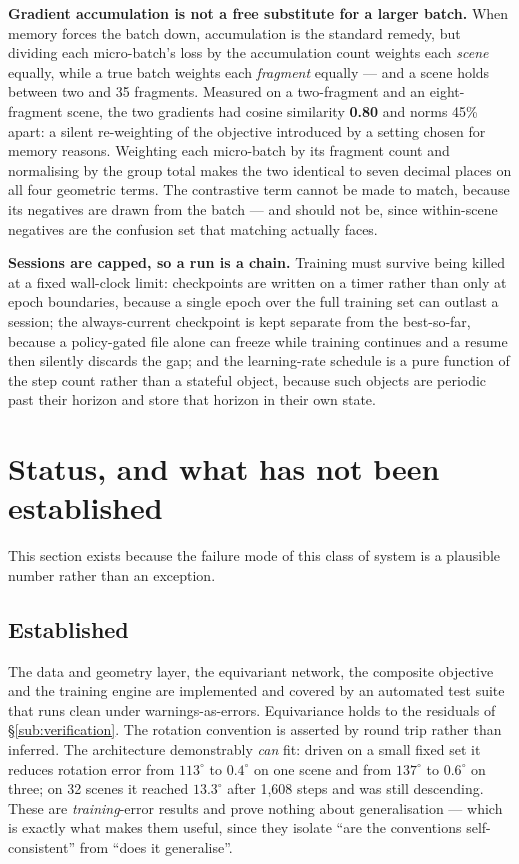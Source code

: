 \documentclass[11pt,a4paper]{report}
\newcommand{\measured}[1]{\textbf{#1}}
\begin{document}
\textbf{Gradient accumulation is not a free substitute for a larger batch.} When
memory forces the batch down, accumulation is the standard remedy, but dividing
each micro-batch's loss by the accumulation count weights each \emph{scene}
equally, while a true batch weights each \emph{fragment} equally --- and a scene
holds between two and 35 fragments. Measured on a two-fragment and an
eight-fragment scene, the two gradients had cosine similarity \measured{0.80}
and norms 45\% apart: a silent re-weighting of the objective introduced by a
setting chosen for memory reasons. Weighting each micro-batch by its fragment
count and normalising by the group total makes the two identical to seven
decimal places on all four geometric terms. The contrastive term cannot be made
to match, because its negatives are drawn from the batch --- and should not be,
since within-scene negatives are the confusion set that matching actually faces.

\textbf{Sessions are capped, so a run is a chain.} Training must survive being
killed at a fixed wall-clock limit: checkpoints are written on a timer rather
than only at epoch boundaries, because a single epoch over the full training set
can outlast a session; the always-current checkpoint is kept separate from the
best-so-far, because a policy-gated file alone can freeze while training
continues and a resume then silently discards the gap; and the learning-rate
schedule is a pure function of the step count rather than a stateful object,
because such objects are periodic past their horizon and store that horizon in
their own state.

\section{Status, and what has not been established}
\label{sec:status}

This section exists because the failure mode of this class of system is a
plausible number rather than an exception.

\subsection{Established}

The data and geometry layer, the equivariant network, the composite objective
and the training engine are implemented and covered by an automated test suite
that runs clean under warnings-as-errors. Equivariance holds to the residuals of
\S\ref{sub:verification}. The rotation convention is asserted by round trip rather than inferred.
The architecture demonstrably \emph{can} fit: driven on a small fixed set it
reduces rotation error from $113^{\circ}$ to \measured{$0.4^{\circ}$} on one
scene and from $137^{\circ}$ to \measured{$0.6^{\circ}$} on three; on 32 scenes
it reached $13.3^{\circ}$ after 1{,}608 steps and was still descending. These
are \emph{training}-error results and prove nothing about generalisation --- which
is exactly what makes them useful, since they isolate ``are the conventions
self-consistent'' from ``does it generalise''.
\end{document}
